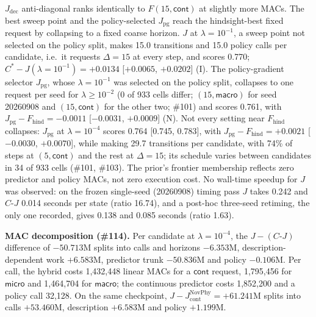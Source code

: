 \begin{revblock}
$J_{\mathrm{dec}}$ anti-diagonal ranks identically to $F(15,\textsf{cont})$ at slightly more MACs. The best sweep point and the policy-selected $J_{\mathrm{pg}}$ reach the hindsight-best fixed request by collapsing to a fixed coarse horizon. $J$ at $\lambda=10^{-1}$, a sweep point not selected on the policy split, makes 15.0 transitions and 15.0 policy calls per candidate, i.e.\ it requests $\Delta=15$ at every step, and scores 0.770; $C^{*}-J(\lambda{=}10^{-1})=+0.0134$ [$+0.0065$, $+0.0202$] (I). The policy-gradient selector $J_{\mathrm{pg}}$, whose $\lambda=10^{-1}$ was selected on the policy split, collapses to one request per seed for $\lambda\geq10^{-2}$ (0 of 933 cells differ; $(15,\textsf{macro})$ for seed 20260908 and $(15,\textsf{cont})$ for the other two; \#101) and scores 0.761, with $J_{\mathrm{pg}}-F_{\mathrm{hind}}=-0.0011$ [$-0.0031$, $+0.0009$] (N). Not every setting near $F_{\mathrm{hind}}$ collapses: $J_{\mathrm{pg}}$ at $\lambda=10^{-4}$ scores 0.764 [0.745, 0.783], with $J_{\mathrm{pg}}-F_{\mathrm{hind}}=+0.0021$ [$-0.0030$, $+0.0070$], while making 29.7 transitions per candidate, with 74\% of steps at $(5,\textsf{cont})$ and the rest at $\Delta=15$; its schedule varies between candidates in 34 of 933 cells (\#101, \#103). The prior's frontier membership reflects zero predictor and policy MACs, not zero execution cost. No wall-time speedup for $J$ was observed: on the frozen single-seed (20260908) timing pass $J$ takes 0.242 and $C\text{-}J$ 0.014 seconds per state (ratio 16.74), and a post-hoc three-seed retiming, the only one recorded, gives 0.138 and 0.085 seconds (ratio 1.63).

\textbf{MAC decomposition (\#114).} Per candidate at $\lambda=10^{-4}$, the $J-(C\text{-}J)$ difference of $-50.713$M splits into calls and horizons $-6.353$M, description-dependent work $+6.583$M, predictor trunk $-50.836$M and policy $-0.106$M. Per call, the hybrid costs 1,432,448 linear MACs for a $\textsf{cont}$ request, 1,795,456 for $\textsf{micro}$ and 1,464,704 for $\textsf{macro}$; the continuous predictor costs 1,852,200 and a policy call 32,128. On the same checkpoint, $J-J_{\mathrm{cont}}^{\mathrm{NovPhy}}=+61.241$M splits into calls $+53.460$M, description $+6.583$M and policy $+1.199$M.
\end{revblock}

\subsection{\texorpdfstring{}{Full live retry-from-start table}}
\label{sec:app:res:live}

